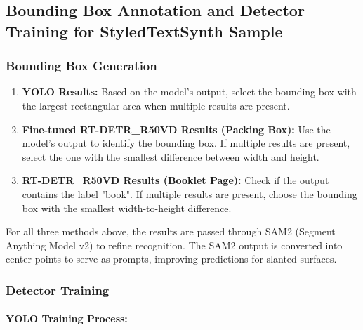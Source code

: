 \subsection{Bounding Box Annotation and Detector Training  for StyledTextSynth Sample}

\subsubsection{Bounding Box Generation}

\begin{enumerate}
    \item \textbf{YOLO Results:} Based on the model's output, select the bounding box with the largest rectangular area when multiple results are present.
    \item \textbf{Fine-tuned RT-DETR\_R50VD Results (Packing Box):} Use the model's output to identify the bounding box. If multiple results are present, select the one with the smallest difference between width and height.
    \item \textbf{RT-DETR\_R50VD Results (Booklet Page):} Check if the output contains the label "book". If multiple results are present, choose the bounding box with the smallest width-to-height difference.
\end{enumerate}

For all three methods above, the results are passed through SAM2 (Segment Anything Model v2) to refine recognition. The SAM2 output is converted into center points to serve as prompts, improving predictions for slanted surfaces.

\subsubsection{Detector Training}

\paragraph{YOLO Training Process:}

